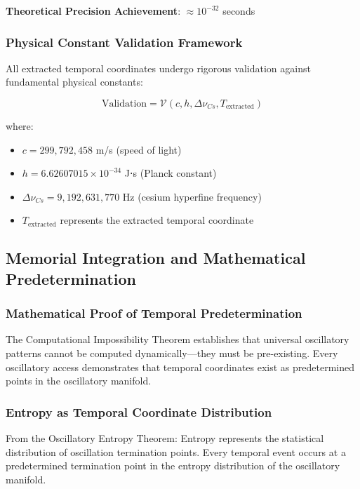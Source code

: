 \documentclass[12pt,a4paper]{article}
\begin{document}
{{{{{{{{{{{{{{\textbf{Theoretical Precision Achievement}: $\approx 10^{-32}$ seconds

\subsubsection{Physical Constant Validation Framework}

All extracted temporal coordinates undergo rigorous validation against fundamental physical constants:

\begin{equation}
\text{Validation} = \mathcal{V}(c, h, \Delta \nu_{Cs}, T_{\text{extracted}})
\end{equation}

where:
\begin{itemize}
\item $c = 299,792,458$ m/s (speed of light)
\item $h = 6.62607015 \times 10^{-34}$ J⋅s (Planck constant)
\item $\Delta \nu_{Cs} = 9,192,631,770$ Hz (cesium hyperfine frequency)
\item $T_{\text{extracted}}$ represents the extracted temporal coordinate
\end{itemize}

\subsection{Memorial Integration and Mathematical Predetermination}

\subsubsection{Mathematical Proof of Temporal Predetermination}

The Computational Impossibility Theorem establishes that universal oscillatory patterns cannot be computed dynamically—they must be pre-existing. Every oscillatory access demonstrates that temporal coordinates exist as predetermined points in the oscillatory manifold.

\subsubsection{Entropy as Temporal Coordinate Distribution}

From the Oscillatory Entropy Theorem: Entropy represents the statistical distribution of oscillation termination points. Every temporal event occurs at a predetermined termination point in the entropy distribution of the oscillatory manifold.

}}}}}}}}}}}}}}
\end{document}
